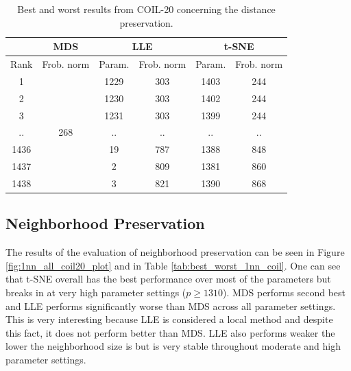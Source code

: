 \begin{table}[]
\centering
\begin{tabular}{|c|cl|cc|cc|}
\hline
 & \multicolumn{2}{c|}{{\color[HTML]{1b9e77} \textbf{MDS}}} & \multicolumn{2}{c|}{{\color[HTML]{d95f02} \textbf{LLE}}} & \multicolumn{2}{c|}{{\color[HTML]{7570B3} \textbf{t-SNE}}} \\ \hline
Rank & \multicolumn{2}{c|}{Frob. norm} & \multicolumn{1}{c|}{Param.} & Frob. norm & \multicolumn{1}{c|}{Param.} & Frob. norm \\ \hline
1 & \multicolumn{2}{c|}{\multirow{7}{*}{268}} & \multicolumn{1}{c|}{1229} & 303 & \multicolumn{1}{c|}{1403} & 244 \\ \cline{1-1} \cline{4-7} 
2 & \multicolumn{2}{c|}{} & \multicolumn{1}{c|}{1230} & 303 & \multicolumn{1}{c|}{1402} & 244 \\ \cline{1-1} \cline{4-7} 
3 & \multicolumn{2}{c|}{} & \multicolumn{1}{c|}{1231} & 303 & \multicolumn{1}{c|}{1399} & 244 \\ \cline{1-1} \cline{4-7} 
.. & \multicolumn{2}{c|}{} & \multicolumn{1}{c|}{..} & .. & \multicolumn{1}{c|}{..} & .. \\ \cline{1-1} \cline{4-7} 
1436 & \multicolumn{2}{c|}{} & \multicolumn{1}{c|}{19} & 787 & \multicolumn{1}{c|}{1388} & 848 \\ \cline{1-1} \cline{4-7} 
1437 & \multicolumn{2}{c|}{} & \multicolumn{1}{c|}{2} & 809 & \multicolumn{1}{c|}{1381} & 860 \\ \cline{1-1} \cline{4-7} 
1438 & \multicolumn{2}{c|}{} & \multicolumn{1}{c|}{3} & 821 & \multicolumn{1}{c|}{1390} & 868 \\ \hline
\end{tabular}
\caption[COIL-20 Distance Preservation]{Best and worst results from COIL-20 concerning the distance preservation.}
\label{tab:best_worst_dist_coil}
\end{table}

\subsection{Neighborhood Preservation}

The results of the evaluation of neighborhood preservation can be seen in Figure \ref{fig:1nn_all_coil20_plot} and in Table \ref{tab:best_worst_1nn_coil}. One can see that t-SNE overall has the best performance over most of the parameters but breaks in at very high parameter settings ($p \geq 1310$). MDS performs second best and LLE performs significantly worse than MDS across all parameter settings. This is very interesting because LLE is considered a local method and despite this fact, it does not perform better than MDS. LLE also performs weaker the lower the neighborhood size is but is very stable throughout moderate and high parameter settings.

